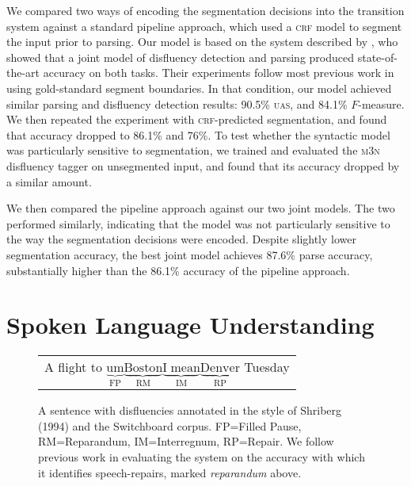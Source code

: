 \documentclass[11pt,letterpaper]{article}
\begin{document}
We compared two ways of encoding the segmentation decisions into the transition
system against a standard pipeline approach, which used a \textsc{crf} model
to segment the input prior to parsing.  Our model is based on the system described
by \citet{honnibal:14}, who showed that a joint model of disfluency detection
and parsing produced state-of-the-art accuracy on both tasks.
Their experiments follow most previous work in using gold-standard segment boundaries.
In that condition, our model achieved similar parsing and disfluency
detection results: 90.5\% \textsc{uas}, and 84.1\% $F$-measure.
We then repeated the experiment with \textsc{crf}-predicted segmentation,
and found that accuracy dropped to 86.1\% and 76\%.
To test whether the syntactic model was particularly sensitive to segmentation,
we trained and evaluated the \citet{qian:13} \textsc{m3n} disfluency tagger on
unsegmented input, and found that its accuracy dropped by a similar amount.

We then compared the pipeline approach against our two joint models.
The two performed similarly, indicating that the model was not particularly
sensitive to the way the segmentation decisions were encoded.
Despite slightly lower segmentation accuracy,
the best joint
model achieves 87.6\% parse accuracy, substantially higher than the 86.1\%
accuracy of the pipeline approach.


\section{Spoken Language Understanding}

\begin{figure}
    \begin{tabular}{l}

        A flight to $\underbrace{\mathrm{um}}_\text{FP} \underbrace{\mathrm{Boston}}_\text{RM} \underbrace{\mathrm{I\;mean}}_\text{IM} \underbrace{\mathrm{Denver}}_\text{RP}$ Tuesday\\

\end{tabular}
\caption{\small A sentence with disfluencies annotated in the style of Shriberg (1994) 
    and the Switchboard corpus.
FP=Filled Pause, RM=Reparandum, IM=Interregnum, RP=Repair.
We follow previous work in evaluating the system on the accuracy with which
it identifies speech-repairs, marked \emph{reparandum} above.
\label{fig:shriberg}}
\end{figure}


\end{document}
